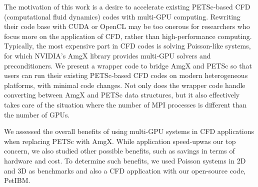 The motivation of this work is a desire to accelerate existing 
PETSc\cite{petsc-web-page}-based CFD (computational fluid dynamics) codes with multi-GPU computing.
Rewriting their code base with CUDA or OpenCL may be too onerous
for researchers who focus more on the application of CFD, rather than high-performance computing.
Typically, the most expensive part in CFD codes is solving Poisson-like systems,
for which NVIDIA's AmgX\cite{amgx-web-page} library provides multi-GPU solvers and preconditioners.
We present a wrapper code to bridge AmgX and PETSc so that users can 
run their existing PETSc-based CFD codes on modern heterogeneous platforms, 
with minimal code changes.
Not only does the wrapper code handle converting between AmgX and PETSc
data structures, but it also effectively takes care of the situation where the number
of MPI processes is different than the number of GPUs.

We assessed the overall benefits of using multi-GPU systems in CFD applications
when replacing PETSc with AmgX.
While application speed-up\footnotemark was our top concern, we also studied 
other possible benefits, such as savings in terms of hardware and cost.
To determine such benefits, we used Poisson systems in 2D and 3D as benchmarks
and also a CFD application with our open-source code, PetIBM.

